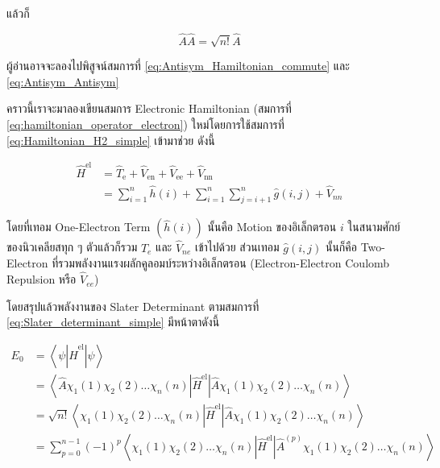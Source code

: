 \noindent แล้วก็

\begin{equation}
  \label{eq:Antisym_Antisym}
  \hat{A} \hat{A} = \sqrt{n !} \hat{A}
\end{equation}

\noindent ผู้อ่านอาจจะลองไปพิสูจน์สมการที่ \eqref{eq:Antisym_Hamiltonian_commute} และ \eqref{eq:Antisym_Antisym}

คราวนี้เราจะมาลองเขียนสมการ Electronic Hamiltonian (สมการที่ \eqref{eq:hamiltonian_operator_electron})
ใหม่โดยการใช้สมการที่ \eqref{eq:Hamiltonian_H2_simple} เข้ามาช่วย ดังนี้

\begin{equation}
  \begin{aligned}
    \hat{H}^{\text{el}}
     & = \hat{T}_{\text{e}}
    + \hat{V}_{\text{en}}
    + \hat{V}_{\text{ee}}
    + \hat{V}_{\text{nn}}          \\
     & = \sum_{i=1}^{n} \hat{h}(i)
    + \sum_{i=1}^{n} \sum_{j=i+1}^{n} \hat{g}(i,j) + \hat{V}_{nn}
  \end{aligned}
\end{equation}

\noindent โดยที่เทอม One-Electron Term $(\hat{h}(i))$ นั้นคือ Motion ของอิเล็กตรอน $i$ ในสนามศักย์ของนิวเคลียสทุก ๆ
ตัวแล้วก็รวม $\hat{T}_e$ และ $\hat{V}_{n e}$ เข้าไปด้วย ส่วนเทอม $\hat{g}(i, j)$ นั้นก็คือ Two-Electron
ที่รวมพลังงานแรงผลักคูลอมบ์ระหว่างอิเล็กตรอน (Electron-Electron Coulomb Repulsion หรือ $\hat{V}_{e e}$)

โดยสรุปแล้วพลังงานของ Slater Determinant ตามสมการที่ \eqref{eq:Slater_determinant_simple} มีหน้าตาดังนี้

\begin{equation}
  \label{eq:energy_Slater_determinant}
  \begin{aligned}
    E_0
     & = \left\langle\psi
    \left|\hat{H}^{\mathrm{el}}\right| \psi\right\rangle                       \\
     & = \left\langle\hat{A} \chi_1(1) \chi_2(2) \dots \chi_n(n)
    \left|\hat{H}^{\mathrm{el}}\right|
    \hat{A} \chi_1(1) \chi_2(2) \dots \chi_n(n)\right\rangle                   \\
     & = \sqrt{n !}\left\langle\chi_1(1) \chi_2(2) \dots \chi_n(n)
    \left|\hat{H}^{\mathrm{el}}\right|
    \hat{A} \chi_1(1) \chi_2(2) \dots \chi_n(n)\right\rangle                   \\
     & = \sum_{p=0}^{n-1}(-1)^p\left\langle\chi_1(1) \chi_2(2) \dots \chi_n(n)
    \left|\hat{H}^{\mathrm{el}}\right|
    \hat{A}^{(p)} \chi_1(1) \chi_2(2) \dots \chi_n(n)\right\rangle
  \end{aligned}
\end{equation}

